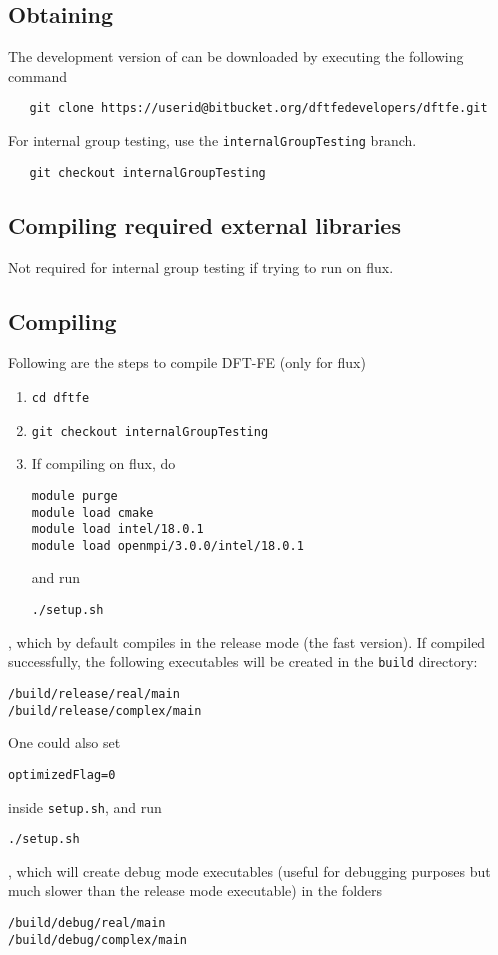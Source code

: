 \subsection{Obtaining \dftfe{}}
The development version of \dftfe{} can be downloaded by executing the following command
\begin{verbatim}
   git clone https://userid@bitbucket.org/dftfedevelopers/dftfe.git
\end{verbatim}
For internal group testing, use the \verb|internalGroupTesting| branch.
\begin{verbatim}
   git checkout internalGroupTesting
\end{verbatim}

\subsection{Compiling required external libraries}
Not required for internal group testing if trying to run \dftfe{} on flux.

\subsection{Compiling \dftfe{}}
Following are the steps to compile DFT-FE (only for flux)
\begin{enumerate}
\item   \begin{verbatim}
cd dftfe
\end{verbatim}
\item \begin{verbatim}
git checkout internalGroupTesting
\end{verbatim}
\item  If compiling on flux, do
\begin{verbatim}
module purge
module load cmake
module load intel/18.0.1
module load openmpi/3.0.0/intel/18.0.1
\end{verbatim}
and run
\begin{verbatim}
./setup.sh
\end{verbatim} 
\end{enumerate}
, which by default compiles in the release mode (the fast version). If \dftfe{} compiled successfully, the following executables will be created in the \verb|build| directory:
\begin{verbatim}
/build/release/real/main
/build/release/complex/main
\end{verbatim}
One could also set
\begin{verbatim}
optimizedFlag=0
\end{verbatim}
inside \verb|setup.sh|, and run
\begin{verbatim}
./setup.sh
\end{verbatim}
, which will create debug mode executables (useful for debugging purposes but much slower than the release mode executable) in the folders
\begin{verbatim}
/build/debug/real/main
/build/debug/complex/main
\end{verbatim}
 
